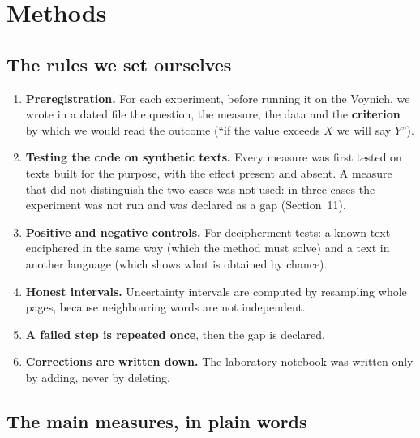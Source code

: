\section{Methods}

\subsection{The rules we set ourselves}

\begin{enumerate}
\item \textbf{Preregistration.} For each experiment, before running it on the Voynich, we wrote in a dated file the
  question, the measure, the data and the \textbf{criterion} by which we would read the outcome (``if the value exceeds
  $X$ we will say $Y$'').
\item \textbf{Testing the code on synthetic texts.} Every measure was first tested on texts built for the purpose, with
  the effect present and absent. A measure that did not distinguish the two cases was not used: in three cases the
  experiment was not run and was declared as a gap (Section~11).
\item \textbf{Positive and negative controls.} For decipherment tests: a known text enciphered in the same way (which the
  method must solve) and a text in another language (which shows what is obtained by chance).
\item \textbf{Honest intervals.} Uncertainty intervals are computed by resampling whole pages, because neighbouring words
  are not independent.
\item \textbf{A failed step is repeated once}, then the gap is declared.
\item \textbf{Corrections are written down.} The laboratory notebook was written only by adding, never by deleting.
\end{enumerate}

\subsection{The main measures, in plain words}

